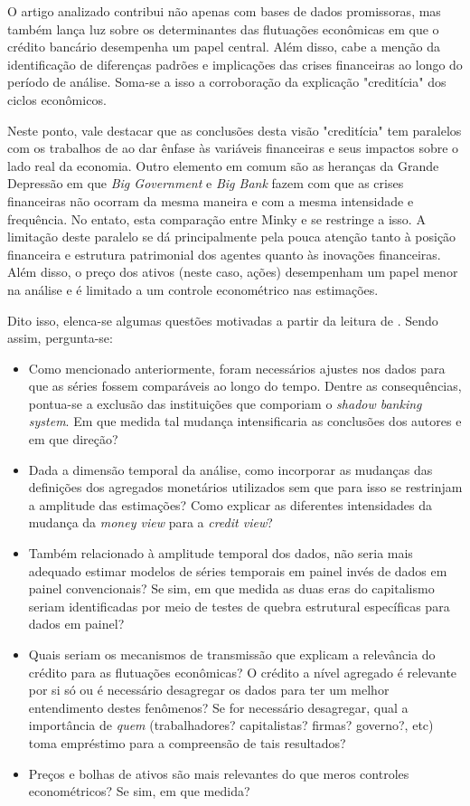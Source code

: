 \documentclass[11pt]{article}
\begin{document}
O artigo analizado contribui não apenas com bases de dados promissoras, mas também lança luz sobre os determinantes das flutuações econômicas em que o crédito bancário desempenha um papel central.
Além disso, cabe a menção da identificação de diferenças padrões e implicações das crises financeiras ao longo do período de análise.
Soma-se a isso a corroboração da explicação "creditícia" dos ciclos econômicos.

Neste ponto, vale destacar que as conclusões desta visão "creditícia" tem paralelos com os trabalhos de \textcite{minsky_1977_Financial} ao dar ênfase às variáveis financeiras e seus impactos sobre o lado real da economia.
Outro elemento em comum são as heranças da Grande Depressão em que \emph{Big Government} e \emph{Big Bank} fazem com que as crises financeiras não ocorram da mesma maneira e com a mesma intensidade e frequência.
No entato, esta comparação entre Minky e \textcite{schularickCreditBoomsGone2012} se restringe a isso.
A limitação deste paralelo se dá principalmente pela pouca atenção tanto à posição financeira e estrutura patrimonial dos agentes quanto às inovações financeiras.
Além disso, o preço dos ativos (neste caso, ações) desempenham um papel menor na análise e é limitado a um controle econométrico nas estimações.

Dito isso, elenca-se algumas questões motivadas a partir da leitura de \textcite{schularickCreditBoomsGone2012}.
Sendo assim, pergunta-se:

\begin{itemize}
\item Como mencionado anteriormente, foram necessários ajustes nos dados para que as séries fossem comparáveis ao longo do tempo. Dentre as consequências, pontua-se a exclusão das instituições que comporiam o \emph{shadow banking system}. Em que medida tal mudança intensificaria as conclusões dos autores e em que direção?
\item Dada a dimensão temporal da análise, como incorporar as mudanças das definições dos agregados monetários utilizados sem que para isso se restrinjam a amplitude das estimações? Como explicar as diferentes intensidades da mudança da \emph{money view} para a \emph{credit view}?
\item Também relacionado à amplitude temporal dos dados, não seria mais adequado estimar modelos de séries temporais em painel invés de dados em painel convencionais? Se sim, em que medida as duas eras do capitalismo seriam identificadas por meio de testes de quebra estrutural específicas para dados em painel?
\item Quais seriam os mecanismos de transmissão que explicam a relevância do crédito para as flutuações econômicas? O crédito a nível agregado é relevante por si só ou é necessário desagregar os dados para ter um melhor entendimento destes fenômenos? Se for necessário desagregar, qual a importância de \emph{quem} (trabalhadores? capitalistas? firmas? governo?, etc) toma empréstimo para a compreensão de tais resultados?
\item Preços e bolhas de ativos são mais relevantes do que meros controles econométricos? Se sim, em que medida?
\end{itemize}
\end{document}
